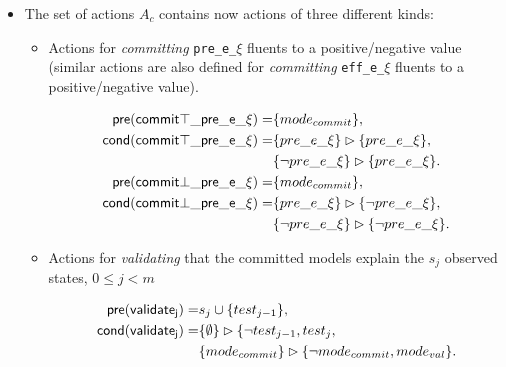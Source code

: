 \documentclass{article}
\newcommand{\pre}{\mathsf{pre}}     %
\newcommand{\cond}{\mathsf{cond}}   %
\begin{document}
\begin{itemize}
      \item The set of actions $A_c$ contains now actions of three different kinds:
\begin{itemize}
      \item Actions for {\em committing} {\tt\small pre\_e\_$\xi$} fluents to a positive/negative value (similar actions are also defined for {\em committing} {\tt\small eff\_e\_$\xi$} fluents to a positive/negative value).
\begin{small}
\begin{align*}
\hspace*{7pt}\pre(\mathsf{commit\top\_pre\_e\_\xi})=&\{mode_{commit}\},\\
\cond(\mathsf{commit\top\_pre\_e\_\xi})=&\{pre\_e\_\xi\}\rhd\{pre\_e\_\xi\},\\
                                    &\{\neg pre\_e\_\xi\}\rhd\{pre\_e\_\xi\}.\\
\hspace*{7pt}\pre(\mathsf{commit\bot\_pre\_e\_\xi})=&\{mode_{commit}\},\\
\cond(\mathsf{commit\bot\_pre\_e\_\xi})=&\{pre\_e\_\xi\}\rhd\{\neg pre\_e\_\xi\},\\
                                    &\{\neg pre\_e\_\xi\}\rhd\{\neg pre\_e\_\xi\}.                                    
\end{align*}
\end{small}

      \item Actions for {\em validating} that the committed models explain the $s_j$ observed states, {\tt\small $0\leq j< m$}
\begin{small}
\begin{align*}
\hspace*{7pt}\pre(\mathsf{validate_{j}})=&s_j\cup\{test_{j-1}\},\\
\cond(\mathsf{validate_{j}})=&\{\emptyset\}\rhd\{\neg test_{j-1}, test_j,\\
                            &\{mode_{commit}\}\rhd\{\neg mode_{commit}, mode_{val}\}.
\end{align*}
\end{small}


\end{itemize}
\end{itemize}
\end{document}
